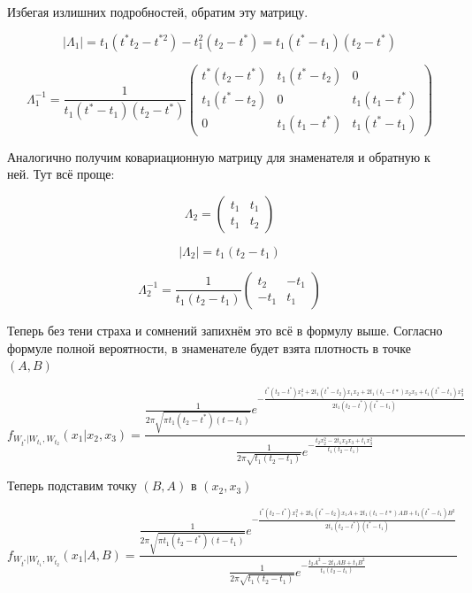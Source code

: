 \documentclass[a4paper,12pt]{article}
\begin{document}
Избегая излишних подробностей, обратим эту матрицу.



\[ |\Lambda_1| = t_1(t^*t_2 - t^{*2}) - t_1^2(t_2 - t^*)  = t_1(t^* - t_1) (t_2 - t^*)\]


\[ \Lambda^{-1}_1  = \frac{1}{ t_1(t^* - t_1) (t_2 - t^*)}  \begin{pmatrix}
t^* (t_2 - t^*) & t_1(t^* - t_2) & 0 \\
 t_1(t^* - t_2) & 0 & t_1(t_1 - t^*) \\
 0 &  t_1(t_1 - t^*) & t_1(t^* - t_1)
\end{pmatrix}\]


Аналогично получим ковариационную матрицу для знаменателя и обратную к ней. Тут всё проще:

\[ \Lambda_2 = \begin{pmatrix}
t_1 & t_1 \\
t_1 & t_2
\end{pmatrix} \]

\[ |\Lambda_2| = t_1(t_2 - t_1) \]

\[ \Lambda_2^{-1} =   \frac{1}{t_1(t_2 - t_1)} \begin{pmatrix}
t_2 & -t_1 \\
-t_1 & t_1
\end{pmatrix} \]

Теперь без тени страха и сомнений запихнём это всё в формулу выше. Согласно формуле полной вероятности, в знаменателе будет взята плотность в точке $ (A,B) $

\[  f_{W_{t^*}|W_{t_1}, W_{t_2}} (x_1|x_2,x_3) =  \frac{\frac{1}{2 \pi \sqrt{\pi  t_1 \left(t_{2}-t^{*}\right)\left(t-t_{1}\right)}} e^{-\frac{t^{*}\left(t_{2}-t^{*}\right) x_{1}^{2}+2 t_{1}\left(t^{*}-t_{2}\right) x_{1} x_{2} + 2 t_{1}\left(t_1-t*\right) x_2 x_{3} +t_{1}\left(t^{*}-t_{1}\right) x_{3}^{2}}{2 t_{1}\left(t_{2}-t^{*}\right)\left(t^{*}-t_{1}\right)}}}{\frac{1}{2 \pi \sqrt{t_{1}\left(t_{2}-t_{1}\right)}} e^{-\frac{t_{2} x_{2}^{2}-2 t_{1} x_{2} x_{3}+t_{1} x_{3}^{2}}{t_{1}\left(t_{2}-t_{1}\right)}}} \]

Теперь подставим точку $ (B,A) $ в $ (x_2, x_3) $

\[  f_{W_{t^*}|W_{t_1}, W_{t_2}} (x_1|A,B) =  \frac{\frac{1}{2 \pi \sqrt{\pi  t_1 \left(t_{2}-t^{*}\right)\left(t-t_{1}\right)}} e^{-\frac{t^{*}\left(t_{2}-t^{*}\right) x_{1}^{2}+2 t_{1}\left(t^{*}-t_{2}\right) x_{1} A + 2 t_{1}\left(t_1-t*\right) A B +t_{1}\left(t^{*}-t_{1}\right) B^{2}}{2 t_{1}\left(t_{2}-t^{*}\right)\left(t^{*}-t_{1}\right)}}}{\frac{1}{2 \pi \sqrt{t_{1}\left(t_{2}-t_{1}\right)}} e^{-\frac{t_{2} A^{2}-2 t_{1} AB+t_{1} B^{2}}{t_{1}\left(t_{2}-t_{1}\right)}}} \]
\end{document}

